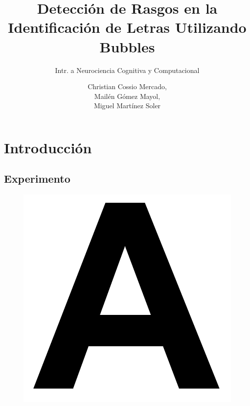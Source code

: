 \documentclass{beamer}
\title{Detecci\'on de Rasgos en la Identificaci\'on de Letras Utilizando Bubbles}
\subtitle{Intr. a Neurociencia Cognitiva y Computacional}
\author[Mart\'inez Soler,\\G\'omez Mayol,\\Cossio Mercado]{Christian Cossio Mercado,\\Mail\'en G\'omez Mayol,\\Miguel Mart\'inez Soler}
\institute{Departamento de Computaci\'on - FCEyN, UBA}
\begin{document}
\begin{frame}
 \titlepage
\end{frame}

\section{Introducci\'on}
\subsection{Experimento}

\begin{frame}
 \begin{figure}
  \includegraphics[scale=.2]{graficos/letra.png}
 \end{figure}
\end{frame}
\end{document}
